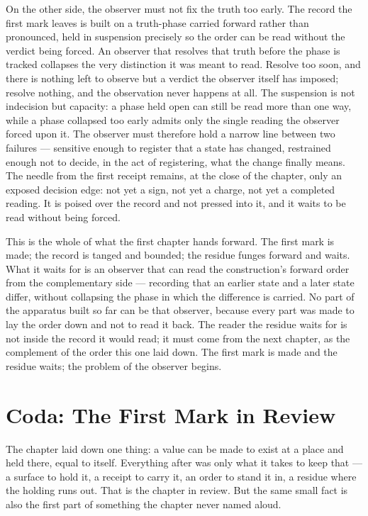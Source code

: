On the other side, the observer must not fix the truth too early. The record the first mark leaves is built on a truth-phase carried forward rather than pronounced, held in suspension precisely so the order can be read without the verdict being forced. An observer that resolves that truth before the phase is tracked collapses the very distinction it was meant to read. Resolve too soon, and there is nothing left to observe but a verdict the observer itself has imposed; resolve nothing, and the observation never happens at all. The suspension is not indecision but capacity: a phase held open can still be read more than one way, while a phase collapsed too early admits only the single reading the observer forced upon it. The observer must therefore hold a narrow line between two failures --- sensitive enough to register that a state has changed, restrained enough not to decide, in the act of registering, what the change finally means. The needle from the first receipt remains, at the close of the chapter, only an exposed decision edge: not yet a sign, not yet a charge, not yet a completed reading. It is poised over the record and not pressed into it, and it waits to be read without being forced.

This is the whole of what the first chapter hands forward. The first mark is made; the record is tanged and bounded; the residue funges forward and waits. What it waits for is an observer that can read the construction's forward order from the complementary side --- recording that an earlier state and a later state differ, without collapsing the phase in which the difference is carried. No part of the apparatus built so far can be that observer, because every part was made to lay the order down and not to read it back. The reader the residue waits for is not inside the record it would read; it must come from the next chapter, as the complement of the order this one laid down. The first mark is made and the residue waits; the problem of the observer begins.

\section*{Coda: The First Mark in Review}

The chapter laid down one thing: a value can be made to exist at a place and held there, equal to itself. Everything after was only what it takes to keep that --- a surface to hold it, a receipt to carry it, an order to stand it in, a residue where the holding runs out. That is the chapter in review. But the same small fact is also the first part of something the chapter never named aloud.

